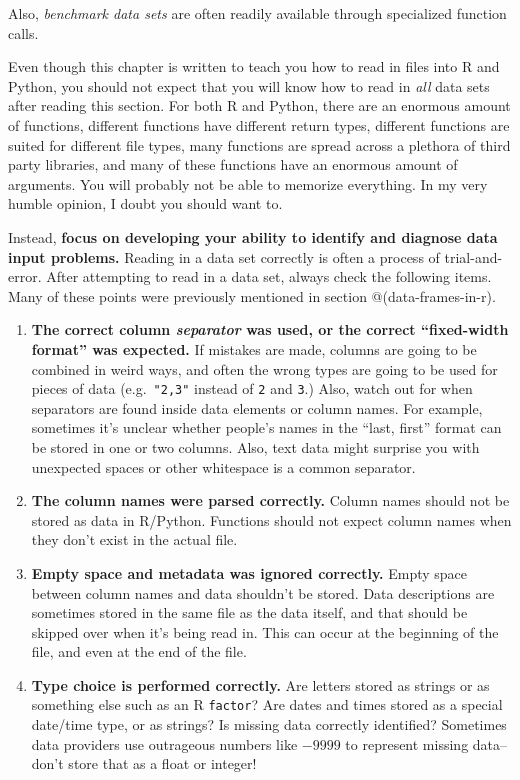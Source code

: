 \documentclass[
  12pt,
]{krantz}
\providecommand{\tightlist}{%
  \setlength{\itemsep}{0pt}\setlength{\parskip}{0pt}}
\begin{document}
Also, \emph{benchmark data sets} are often readily available through specialized function calls.

Even though this chapter is written to teach you how to read in files into R and Python, you should not expect that you will know how to read in \emph{all} data sets after reading this section. For both R and Python, there are an enormous amount of functions, different functions have different return types, different functions are suited for different file types, many functions are spread across a plethora of third party libraries, and many of these functions have an enormous amount of arguments. You will probably not be able to memorize everything. In my very humble opinion, I doubt you should want to.

Instead, \textbf{focus on developing your ability to identify and diagnose data input problems.} Reading in a data set correctly is often a process of trial-and-error. After attempting to read in a data set, always check the following items. Many of these points were previously mentioned in section @(data-frames-in-r).

\begin{enumerate}
\def\labelenumi{\arabic{enumi}.}
\tightlist
\item
  \textbf{The correct column \emph{separator} was used, or the correct ``fixed-width format'' was expected.} If mistakes are made, columns are going to be combined in weird ways, and often the wrong types are going to be used for pieces of data (e.g.~\texttt{"2,3"} instead of \texttt{2} and \texttt{3}.) Also, watch out for when separators are found inside data elements or column names. For example, sometimes it's unclear whether people's names in the ``last, first'' format can be stored in one or two columns. Also, text data might surprise you with unexpected spaces or other whitespace is a common separator.
\item
  \textbf{The column names were parsed correctly.} Column names should not be stored as data in R/Python. Functions should not expect column names when they don't exist in the actual file.
\item
  \textbf{Empty space and metadata was ignored correctly.} Empty space between column names and data shouldn't be stored. Data descriptions are sometimes stored in the same file as the data itself, and that should be skipped over when it's being read in. This can occur at the beginning of the file, and even at the end of the file.
\item
  \textbf{Type choice is performed correctly.} Are letters stored as strings or as something else such as an R \texttt{factor}? Are dates and times stored as a special date/time type, or as strings? Is missing data correctly identified? Sometimes data providers use outrageous numbers like \(-9999\) to represent missing data--don't store that as a float or integer!
\end{enumerate}
\end{document}
